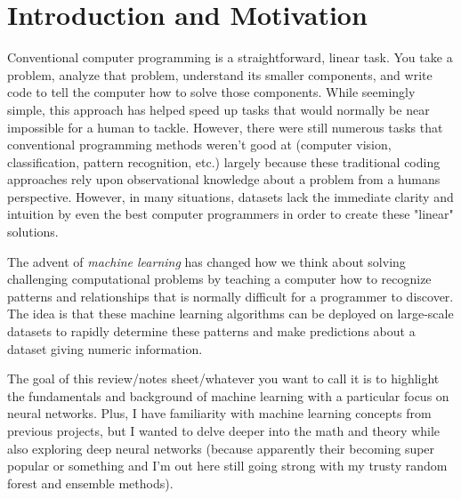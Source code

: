 \documentclass[11pt]{article}
\theoremstyle{definition}
\begin{document}
\title{}
\author{Prathik Naidu\\ \texttt{prathik.naidu@stanford.edu}}
\maketitle


\section{Introduction and Motivation}
Conventional computer programming is a straightforward, linear task. You take a problem, analyze that problem, understand its smaller components, and write code to tell the computer how to solve those components. While seemingly simple, this approach has helped speed up tasks that would normally be near impossible for a human to tackle. However, there were still numerous tasks that conventional programming methods weren't good at (computer vision, classification, pattern recognition, etc.) largely because these traditional coding approaches rely upon observational knowledge about a problem from a humans perspective. However, in many situations, datasets lack the immediate clarity and intuition by even the best computer programmers in order to create these "linear" solutions. 

The advent of \textit{machine learning} has changed how we think about solving challenging computational problems by teaching a computer how to recognize patterns and relationships that is normally difficult for a programmer to discover. The idea is that these machine learning algorithms can be deployed on large-scale datasets to rapidly determine these patterns and make predictions about a dataset giving numeric information.

The goal of this review/notes sheet/whatever you want to call it is to highlight the fundamentals and background of machine learning with a particular focus on neural networks. Plus, I have familiarity with machine learning concepts from previous projects, but I wanted to delve deeper into the math and theory while also exploring deep neural networks (because apparently their becoming super popular or something and I'm out here still going strong with my trusty random forest and ensemble methods).
\end{document}
